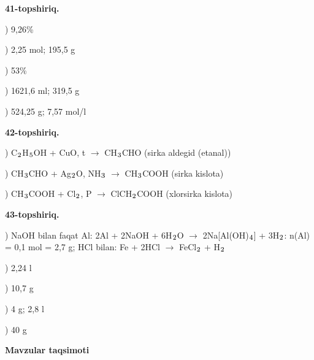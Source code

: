 \documentclass[11pt,a4paper]{article}
\renewcommand{\textsubscript}[1]{\ensuremath{_{\text{\fontsize{8}{8}\selectfont #1}}}}
\begin{document}
\noindent\textbf{41-topshiriq.}\par
{}) 9,26\%\par
{}) 2,25 mol; 195,5 g\par
{}) 53\%\par
{}) 1621,6 ml; 319,5 g\par
{}) 524,25 g; 7,57 mol/l\par
\noindent\textbf{42-topshiriq.}\par
{}) C\textsubscript{2}H\textsubscript{5}OH + CuO, t\textdegree{} $\to$ CH\textsubscript{3}CHO (sirka aldegid (etanal))\par
{}) CH\textsubscript{3}CHO + Ag\textsubscript{2}O, NH\textsubscript{3} $\to$ CH\textsubscript{3}COOH (sirka kislota)\par
{}) CH\textsubscript{3}COOH + Cl\textsubscript{2}, P $\to$ ClCH\textsubscript{2}COOH (xlorsirka kislota)\par
\noindent\textbf{43-topshiriq.}\par
{}) NaOH bilan faqat Al: 2Al + 2NaOH + 6H\textsubscript{2}O $\to$ 2Na[Al(OH)\textsubscript{4}] + 3H\textsubscript{2}: n(Al) = 0,1 mol = 2,7 g; HCl bilan: Fe + 2HCl $\to$ FeCl\textsubscript{2} + H\textsubscript{2}\par
{}) 2,24 l\par
{}) 10,7 g\par
{}) 4 g; 2,8 l\par
{}) 40 g\par
\par\bigskip\noindent\textbf{Mavzular taqsimoti}\par\smallskip
\end{document}
